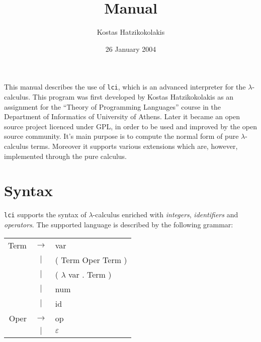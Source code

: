 \documentclass[a4paper,11pt]{article}
\author{
	Kostas Hatzikokolakis
}
\title{
	\kwd{lci} Manual
}
\date{26 January 2004}
\newcommand{\la}{$\lambda$}
\newcommand{\lci}{\texttt{lci}}
\newcommand{\lc}{$\lambda$-calculus}
\newcommand{\qm}[1]{``#1''}
\begin{document}
\maketitle
\vspace{60pt}

This manual describes the use of \lci{}, which is an advanced
interpreter for the \lc. This program was first developed by Kostas
Hatzikokolakis as an assignment for the \qm{Theory of Programming Languages} course
in the Department of Informatics of University of Athens. Later it became an
open source project licenced under GPL, in order to be used and improved by
the open source community. It's main purpose is to compute the normal form of
pure \lc{} terms. Moreover it supports various extensions which are, however,
implemented through the pure calculus.

\section{Syntax}
\lci{} supports the syntax of \lc{} enriched with \emph{integers}, \emph{identifiers}
and \emph{operators}. The supported language is described by the following grammar:

\begin{center}
	\begin{tabular}{rcl}
		Term	& $\rightarrow$ & var \\
		& $|$ & ( Term Oper Term ) \\
		& $|$ & ( \la{} var . Term ) \\
		& $|$ & num \\
		& $|$ & id \\
		Oper & $\rightarrow$ & op \\
		& $|$ & $\varepsilon$
	\end{tabular}
\end{center}
\end{document}
